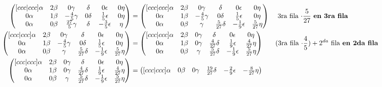 \documentclass[letterpaper]{article}
\renewcommand{\*}{\cdot}
\theoremstyle{definition}
\begin{document}
\begin{align*}
		 \begin{pmatrix}[ccc|ccc]
		 \alpha & 2\beta & 0\gamma & \delta & 0\epsilon & 0\eta\\
		 0\alpha & 1\beta & -\frac{4}{5}\gamma& 0\delta & \frac{1}{5}\epsilon & 0\eta\\
		 0\alpha & 0\beta & \frac{27}{5}\gamma & \delta & -\frac{3}{5}\epsilon & \eta
		 \end{pmatrix} & = \begin{pmatrix}[ccc|ccc]
		 \alpha & 2\beta & 0\gamma & \delta & 0\epsilon & 0\eta\\
		 0\alpha & 1\beta & -\frac{4}{5}\gamma& 0\delta & \frac{1}{5}\epsilon & 0\eta\\
		 0\alpha & 0\beta & \gamma & \frac{5}{27}\delta & -\frac{1}{9}\epsilon & \frac{5}{27}\eta
		 \end{pmatrix} && \text{ 3ra fila $ \* \frac{5}{27}$ \textbf{en 3ra fila} }\\
		 \begin{pmatrix}[ccc|ccc]
		 \alpha & 2\beta & 0\gamma & \delta & 0\epsilon & 0\eta\\
		 0\alpha & 1\beta & -\frac{4}{5}\gamma& 0\delta & \frac{1}{5}\epsilon & 0\eta\\
		 0\alpha & 0\beta & \gamma & \frac{5}{27}\delta & -\frac{1}{9}\epsilon & \frac{5}{27}\eta
		 \end{pmatrix} &= \begin{pmatrix}[ccc|ccc]
		 \alpha & 2\beta & 0\gamma & \delta & 0\epsilon & 0\eta\\
		 0\alpha & 1\beta & 0\gamma& \frac{4}{27}\delta & \frac{1}{9}\epsilon & \frac{4}{27}\eta\\
		 0\alpha & 0\beta & \gamma & \frac{5}{27}\delta & -\frac{1}{9}\epsilon & \frac{5}{27}\eta
		 \end{pmatrix} && \text{(3ra fila $ \* \dfrac{4}{5}) + 2^{da} $  fila \textbf{en 2da fila} }\\
		 \begin{pmatrix}[ccc|ccc]
		 \alpha & 2\beta & 0\gamma & \delta & 0\epsilon & 0\eta\\
		 0\alpha & 1\beta & 0\gamma& \frac{4}{27}\delta & \frac{1}{9}\epsilon & \frac{4}{27}\eta\\
		 0\alpha & 0\beta & \gamma & \frac{5}{27}\delta & -\frac{1}{9}\epsilon & \frac{5}{27}\eta
		 \end{pmatrix} & = \begin{pmatrix}[ccc|ccc]
		 \alpha & 0\beta & 0\gamma & \frac{19}{27}\delta & -\frac{2}{9}\epsilon & -\frac{8}{27}\eta\\

\end{pmatrix}
\end{align*}
\end{document}
